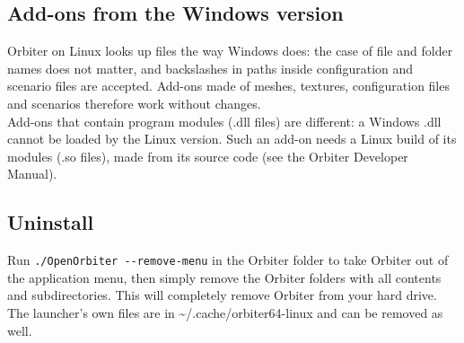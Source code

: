 \documentclass[Orbiter User Manual.tex]{subfiles}
\begin{document}
\noindent
{}

\subsection{Add-ons from the Windows version}
Orbiter on Linux looks up files the way Windows does: the case of file and folder names does not matter, and backslashes in paths inside configuration and scenario files are accepted. Add-ons made of meshes, textures, configuration files and scenarios therefore work without changes.\\
Add-ons that contain program modules (.dll files) are different: a Windows .dll cannot be loaded by the Linux version. Such an add-on needs a Linux build of its modules (.so files), made from its source code (see the Orbiter Developer Manual).

\subsection{Uninstall}
Run \texttt{./OpenOrbiter -{}-remove-menu} in the Orbiter folder to take Orbiter out of the application menu, then simply remove the Orbiter folders with all contents and subdirectories. This will completely remove Orbiter from your hard drive. The launcher's own files are in \textasciitilde/.cache/orbiter64-linux and can be removed as well.
\end{document}
